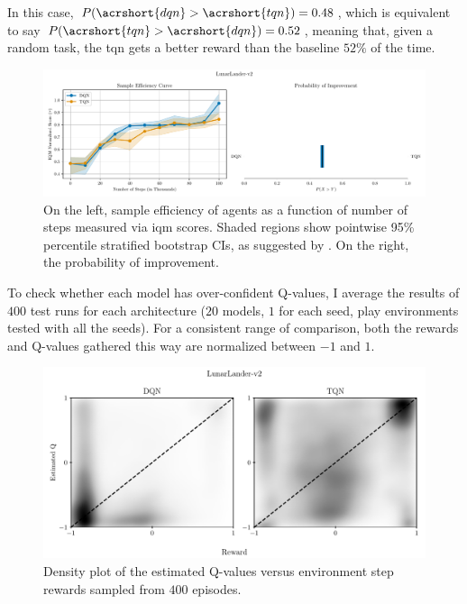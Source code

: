 In this case, $P(\acrshort{dqn} > \acrshort{tqn}) = 0.48$, which is equivalent to say $P(\acrshort{tqn} > \acrshort{dqn}) = 0.52$, meaning that, given a random task, the \acrlong{tqn} gets a better reward than the baseline $52\%$ of the time.

\begin{figure}[!htbp]
\centering
\includegraphics[width=\textwidth]{images/sample-efficiency-probability-improvement_DQN-TQN_LunarLander-v2.pdf}
\caption{On the left, sample efficiency of agents as a function of number of steps measured via \acrshort{iqm} scores. Shaded regions show pointwise 95\% percentile stratified bootstrap CIs, as suggested by \cite{rliable}. On the right, the probability of improvement.}
\label{fig:sample-efficiency-LunarLander-v2}
\end{figure}

To check whether each model has over-confident Q-values, I average the results of $400$ test runs for each architecture ($20$ models, $1$ for each seed, play environments tested with all the seeds). For a consistent range of comparison, both the rewards and Q-values gathered this way are normalized between $-1$ and $1$.

\begin{figure}[!htbp]
\centering
\includegraphics[width=\textwidth]{images/q-vs-reward_LunarLander-v2.pdf}
\caption{Density plot of the estimated Q-values versus environment step rewards sampled from $400$ episodes.}
\label{fig:q-vs-reward-LunarLander-v2}
\end{figure}

